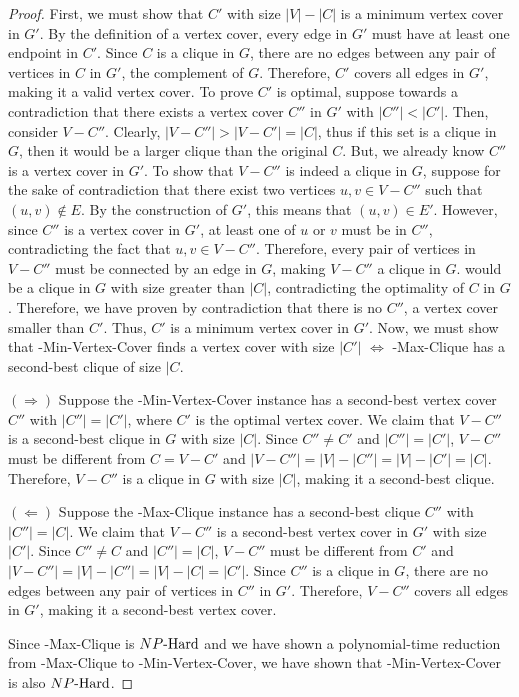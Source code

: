 \begin{proof}
First, we must show that $C'$ with size $|V| - |C|$ is a minimum vertex cover in $G'$. By the definition of a vertex cover, every edge in $G'$ must have at least one endpoint in $C'$. Since $C$ is a clique in $G$, there are no edges between any pair of vertices in $C$ in $G'$, the complement of $G$. Therefore, $C'$ covers all edges in $G'$, making it a valid vertex cover. To prove $C'$ is optimal, suppose towards a contradiction that there exists a vertex cover $C''$ in $G'$ with $|C''| < |C'|$. Then, consider $V - C''$. Clearly, $|V-C''| > |V-C'| = |C|$, thus if this set is a clique in $G$, then it would be a larger clique than the original $C$. But, we already know $C''$ is a vertex cover in $G'$. To show that $V - C''$ is indeed a clique in $G$, suppose for the sake of contradiction that there exist two vertices $u, v \in V - C''$ such that $(u, v) \notin E$. By the construction of $G'$, this means that $(u, v) \in E'$. However, since $C''$ is a vertex cover in $G'$, at least one of $u$ or $v$ must be in $C''$, contradicting the fact that $u, v \in V - C''$. Therefore, every pair of vertices in $V - C''$ must be connected by an edge in $G$, making $V - C''$ a clique in $G$. would be a clique in $G$ with size greater than $|C|$, contradicting the optimality of $C$ in $G$. Therefore, we have proven by contradiction that there is no $C''$, a vertex cover smaller than $C'$. Thus, $C'$ is a minimum vertex cover in $G'$. Now, we must show that \inob{}-Min-Vertex-Cover finds a vertex cover with size $|C'|$ $\iff$ \inob{}-Max-Clique has a second-best clique of size $|C$. 

$(\Rightarrow)$ Suppose the \inob{}-Min-Vertex-Cover instance has a second-best vertex cover $C''$ with $|C''| = |C'|$, where $C'$ is the optimal vertex cover. We claim that $V - C''$ is a second-best clique in $G$ with size $|C|$. Since $C'' \neq C'$ and $|C''| = |C'|$, $V - C''$ must be different from $C = V - C'$ and $|V - C''| = |V| - |C''| = |V| - |C'| = |C|$. Therefore, $V - C''$ is a clique in $G$ with size $|C|$, making it a second-best clique.

$(\Leftarrow)$ Suppose the \inob{}-Max-Clique instance has a second-best clique $C''$ with $|C''| = |C|$. We claim that $V - C''$ is a second-best vertex cover in $G'$ with size $|C'|$. Since $C'' \neq C$ and $|C''| = |C|$, $V - C''$ must be different from $C'$ and $|V - C''| = |V| - |C''| = |V| - |C| = |C'|$. Since $C''$ is a clique in $G$, there are no edges between any pair of vertices in $C''$ in $G'$. Therefore, $V - C''$ covers all edges in $G'$, making it a second-best vertex cover.

Since \inob{}-Max-Clique is ${NP\text{-Hard{}}}$ and we have shown a polynomial-time reduction from \inob{}-Max-Clique to \inob{}-Min-Vertex-Cover, we have shown that \inob{}-Min-Vertex-Cover is also ${NP\text{-Hard{}}}$.
\end{proof}


